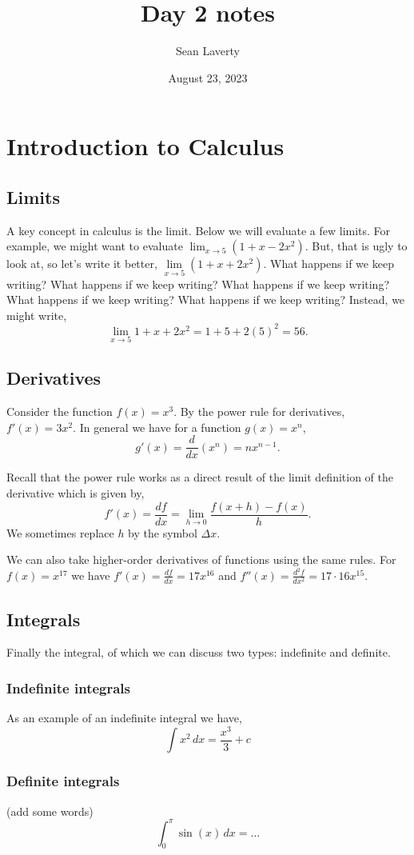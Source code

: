 \documentclass{article}
\title{Day 2 notes}
\author{Sean Laverty}
\date{August 23, 2023}
\begin{document}
\maketitle

\newpage

\tableofcontents
\newpage

\section{Introduction to Calculus}


\subsection{Limits}
A key concept in calculus is the limit.  Below we will evaluate a few limits.  For example, we might want to evaluate \( \lim_{x \to 5} (1+x-2x^2)\). But, that is ugly to look at, so let's write it better, \(\lim\limits_{x \to 5} (1 + x + 2x^2)\). What happens if we keep writing? What happens if we keep writing? What happens if we keep writing? What happens if we keep writing? What happens if we keep writing?  Instead, we might write, \[\lim_{x \to 5} 1 + x + 2x^2 = 1 + 5 + 2(5)^2 = 56.\]

\subsection{Derivatives}
Consider the function \(f(x) = x^3\). By the power rule for derivatives, \(f'(x) = 3x^2\). In general we have for a function \(g(x) = x^n\), \[g'(x) = \frac{d}{dx}(x^{n}) = nx^{n-1}.\] %

Recall that the power rule works as a direct result of the limit definition of the derivative which is given by, \[ f'(x) = \frac{df}{dx} = \lim_{h \to 0} \frac{f(x+h) - f(x)}{h}.\] We sometimes replace \(h\) by the symbol \(\Delta x\).

We can also take higher-order derivatives of functions using the same rules.    For \(f(x) = x^{17}\) we have \(f'(x) = \frac{df}{dx} = 17x^{16}\) and \(f''(x) = \frac{d^{2}\!f}{dx^2} = 17\cdot16x^{15}\).

\subsection{Integrals}
Finally the integral, of which we can discuss two types: indefinite and definite.
\subsubsection{Indefinite integrals}
As an example of an indefinite integral we have, \[\int x^2\,dx = \frac{x^{3}}{3} + c\]
\subsubsection{Definite integrals}
(add some words) \[\int_{0}^{\pi} \sin(x)\,dx = \dots\]
\end{document}
